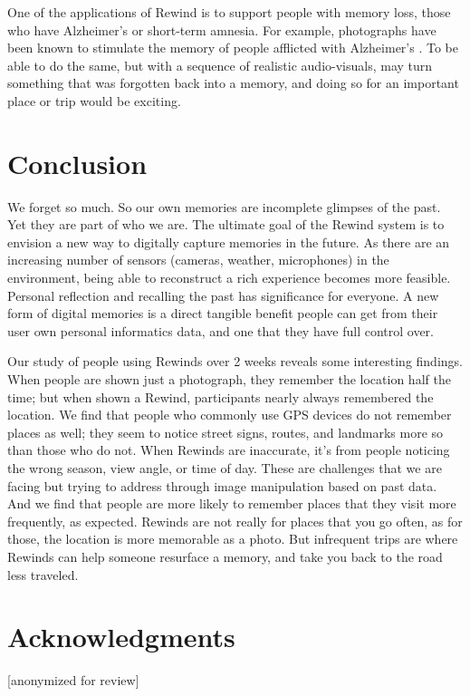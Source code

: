\documentclass{sigchi}
\begin{document}
One of the applications of Rewind is to support people with memory loss, those who have Alzheimer's or short-term amnesia. For example, photographs have been known to stimulate the memory of people afflicted with Alzheimer's \cite{grandmaison2003critical}. To be able to do the same, but with a sequence of realistic audio-visuals, may turn something that was forgotten back into a memory, and doing so for an important place or trip would be exciting.

\section{Conclusion}
We forget so much. So our own memories are incomplete glimpses of the past. Yet they are part of who we are. The ultimate goal of the Rewind system is to envision a new way to digitally capture memories in the future. As there are an increasing number of sensors (cameras, weather, microphones) in the environment, being able to reconstruct a rich experience becomes more feasible. Personal reflection and recalling the past has significance for everyone. A new form of digital memories is a direct tangible benefit people can get from their user own personal informatics data, and one that they have full control over.

Our study of people using Rewinds over 2 weeks reveals some interesting findings. When people are shown just a photograph, they remember the location half the time; but when shown a Rewind, participants nearly always remembered the location. We find that people who commonly use GPS devices do not remember places as well; they seem to notice street signs, routes, and landmarks more so than those who do not. When Rewinds are inaccurate, it's from people noticing the wrong season, view angle, or time of day. These are challenges that we are facing but trying to address through image manipulation based on past data. And we find that people are more likely to remember places that they visit more frequently, as expected. Rewinds are not really for places that you go often, as for those, the location is more memorable as a photo. But infrequent trips are where Rewinds can help someone resurface a memory, and take you back to the road less traveled.

\section{Acknowledgments}
[anonymized for review]

\balance



\end{document}
